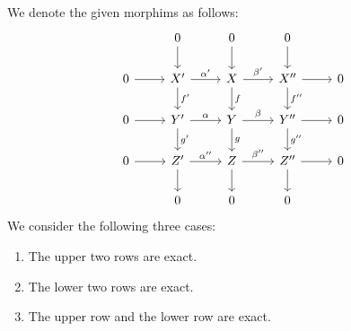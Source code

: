 \section{}

We denote the given morphims as follows:
\begin{equation}
  \label{3x3 diagram}
  \begin{tikzcd}
      {}
    & 0
      \arrow{d}
    & 0
      \arrow{d}
    & 0
      \arrow{d}
    & {}
  \\
      0
      \arrow{r}
    & X'
      \arrow{r}[above]{\alpha'}
      \arrow{d}[right]{f'}
    & X
      \arrow{r}[above]{\beta'}
      \arrow{d}[right]{f}
    & X''
      \arrow{r}
      \arrow{d}[right]{f''}
    & 0
    \\
      0
      \arrow{r}
    & Y'
      \arrow{r}[above]{\alpha}
      \arrow{d}[right]{g'}
    & Y
      \arrow{r}[above]{\beta}
      \arrow{d}[right]{g}
    & Y''
      \arrow{r}
      \arrow{d}[right]{g''}
    & 0
    \\
      0
      \arrow{r}
    & Z'
      \arrow{r}[above]{\alpha''}
      \arrow{d}
    & Z
      \arrow{r}[above]{\beta''}
      \arrow{d}
    & Z''
      \arrow{r}
      \arrow{d}
    & 0
    \\
      {}
    & 0
    & 0
    & 0
    & {}
  \end{tikzcd}
\end{equation}
We consider the following three cases:

\begin{enumerate}[label = (\roman*)]
  \item
    The upper two rows are exact.
  \item
    The lower two rows are exact.
  \item
    The upper row and the lower row are exact.
\end{enumerate}





\subsection{}
\label{upper rows are exact}

